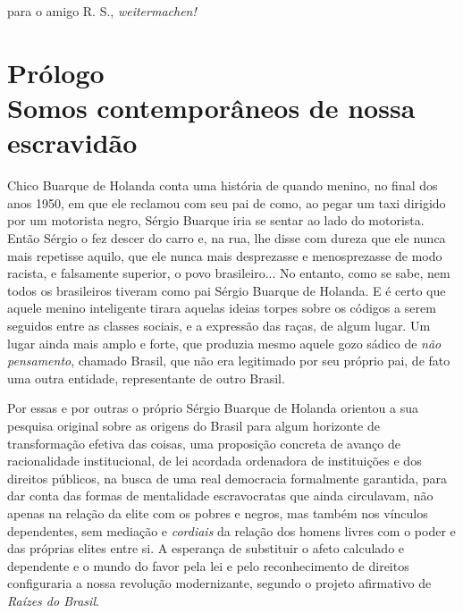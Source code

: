 \chapter*{}

\vspace*{\fill}

\thispagestyle{empty}

\begin{flushright}
para o amigo R. S., \emph{weitermachen!}
\end{flushright}

\chapter*{Prólogo\\
Somos contemporâneos de nossa escravidão}

Chico Buarque de Holanda conta uma história de quando menino, no final
dos anos 1950, em que ele reclamou com seu pai de como, ao pegar um taxi
dirigido por um motorista negro, Sérgio Buarque iria se sentar ao lado
do motorista. Então Sérgio o fez descer do carro e, na rua, lhe disse
com dureza que ele nunca mais repetisse aquilo, que ele nunca mais
desprezasse e menosprezasse de modo racista, e falsamente superior, o
povo brasileiro... No entanto, como se sabe, nem todos os brasileiros
tiveram como pai Sérgio Buarque de Holanda. E é certo que aquele menino
inteligente tirara aquelas ideias torpes sobre os códigos a serem
seguidos entre as classes sociais, e a expressão das raças, de algum
lugar. Um lugar ainda mais amplo e forte, que produzia mesmo aquele gozo
sádico de \emph{não pensamento}, chamado Brasil, que não era legitimado
por seu próprio pai, de fato uma outra entidade, representante de outro
Brasil.

Por essas e por outras o próprio Sérgio Buarque de Holanda orientou a
sua pesquisa original sobre as origens do Brasil para algum horizonte de
transformação efetiva das coisas, uma proposição concreta de avanço de
racionalidade institucional, de lei acordada ordenadora de instituições
e dos direitos públicos, na busca de uma real democracia formalmente
garantida, para dar conta das formas de mentalidade escravocratas que
ainda circulavam, não apenas na relação da elite com os pobres e negros,
mas também nos vínculos dependentes, sem mediação e \emph{cordiais} da
relação dos homens livres com o poder e das próprias elites entre si. A
esperança de substituir o afeto calculado e dependente e o mundo do
favor pela lei e pelo reconhecimento de direitos configuraria a nossa
revolução modernizante, segundo o projeto afirmativo de \emph{Raízes do
Brasil}.

